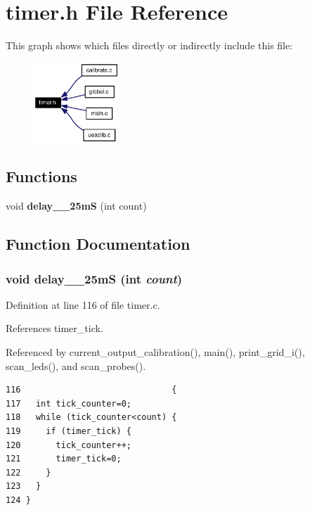 \section{timer.h File Reference}
\label{timer_8h}


This graph shows which files directly or indirectly include this file:\begin{figure}[H]
\begin{center}
\leavevmode
\includegraphics[width=91pt]{timer_8h__dep__incl}
\end{center}
\end{figure}
\subsection*{Functions}
\begin{CompactItemize}
\item 
void {\bf delay\_\_\-25m\-S} (int count)
\end{CompactItemize}


\subsection{Function Documentation}
\subsubsection{\setlength{\rightskip}{0pt plus 5cm}void delay\_\_\-25m\-S (int {\em count})}\label{timer_8h_a0}




Definition at line 116 of file timer.c.

References timer\_\-tick.

Referenced by current\_\-output\_\-calibration(), main(), print\_\-grid\_\-i(), scan\_\-leds(), and scan\_\-probes().

\footnotesize\begin{verbatim}116                              {
117   int tick_counter=0;
118   while (tick_counter<count) {
119     if (timer_tick) {
120       tick_counter++;
121       timer_tick=0;
122     }
123   }
124 }
\end{verbatim}\normalsize 


